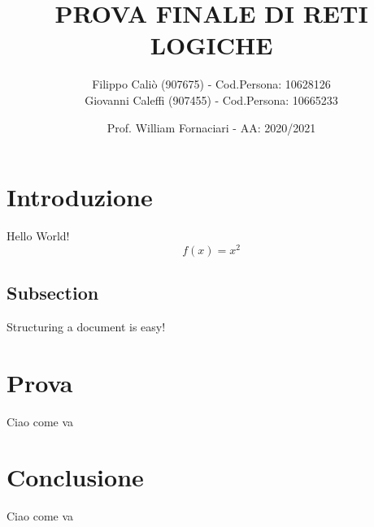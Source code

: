 \documentclass[12pt]{article}
\title{PROVA FINALE DI RETI LOGICHE}
\date{Prof. William Fornaciari - AA: 2020/2021}
\author{Filippo Caliò (907675) - Cod.Persona: 10628126 \\ Giovanni Caleffi (907455) - Cod.Persona: 10665233}
\begin{document}
\maketitle
{}
\tableofcontents

\newpage
{}

\section{Introduzione}

Hello World!
\begin{equation*}
  f(x) = x^2
\end{equation*}

\subsection{Subsection}

Structuring a document is easy!


\section{Prova}
Ciao come va

\section{Conclusione}
Ciao come va
\end{document}
